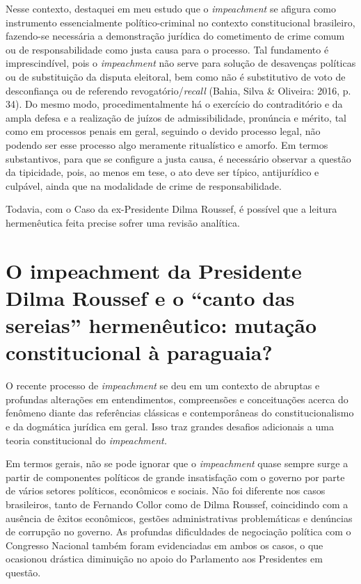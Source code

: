 Nesse contexto, destaquei em meu estudo que o \emph{impeachment} se
afigura como instrumento essencialmente político-criminal no contexto
constitucional brasileiro, fazendo-se necessária a demonstração jurídica
do cometimento de crime comum ou de responsabilidade como justa causa
para o processo. Tal fundamento é imprescindível, pois o
\emph{impeachment} não serve para solução de desavenças políticas ou de
substituição da disputa eleitoral, bem como não é substitutivo de voto
de desconfiança ou de referendo revogatório/\emph{recall} (Bahia, Silva
\& Oliveira: 2016, p. 34). Do mesmo modo, procedimentalmente há o
exercício do contraditório e da ampla defesa e a realização de juízos de
admissibilidade, pronúncia e mérito, tal como em processos penais em
geral, seguindo o devido processo legal, não podendo ser esse processo
algo meramente ritualístico e amorfo. Em termos substantivos, para que
se configure a justa causa, é necessário observar a questão da
tipicidade, pois, ao menos em tese, o ato deve ser típico, antijurídico
e culpável, ainda que na modalidade de crime de responsabilidade.

Todavia, com o Caso da ex-Presidente Dilma Roussef, é possível que a
leitura hermenêutica feita precise sofrer uma revisão analítica.

\section{O impeachment da Presidente Dilma Roussef e o ``canto
  das sereias'' hermenêutico: mutação constitucional à paraguaia?}


O recente processo de \emph{impeachment} se deu em um contexto de
abruptas e profundas alterações em entendimentos, compreensões e
conceituações acerca do fenômeno diante das referências clássicas e
contemporâneas do constitucionalismo e da dogmática jurídica em geral.
Isso traz grandes desafios adicionais a uma teoria constitucional do
\emph{impeachment.}

Em termos gerais, não se pode ignorar que o \emph{impeachment} quase
sempre surge a partir de componentes políticos de grande insatisfação
com o governo por parte de vários setores políticos, econômicos e
sociais. Não foi diferente nos casos brasileiros, tanto de Fernando
Collor como de Dilma Roussef, coincidindo com a ausência de êxitos
econômicos, gestões administrativas problemáticas e denúncias de
corrupção no governo. As profundas dificuldades de negociação política
com o Congresso Nacional também foram evidenciadas em ambos os casos, o
que ocasionou drástica diminuição no apoio do Parlamento aos Presidentes
em questão.

